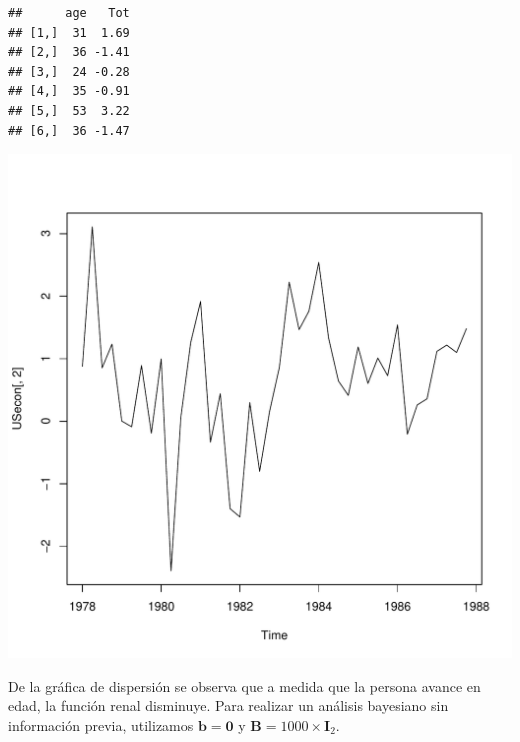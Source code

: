 \begin{Eje}
\begin{knitrout}
\begin{kframe}
{\ttfamily\noindent\itshape\color{messagecolor}{\#\# The following object is masked \_by\_ .GlobalEnv:\\\#\# \\\#\#\ \ \ \  kidneydata}}\begin{alltt}
\end{alltt}
\begin{verbatim}
##      age   Tot
## [1,]  31  1.69
## [2,]  36 -1.41
## [3,]  24 -0.28
## [4,]  35 -0.91
## [5,]  53  3.22
## [6,]  36 -1.47
\end{verbatim}
\begin{alltt}
\hlstd{(kidneydata[,}\hlstd{], kidneydata[,}\hlstd{],}\hlstd{=}\hlstd{,} \hlstd{=}\hlstd{)}
\end{alltt}
\end{kframe}
\includegraphics[width=\maxwidth]{figure/unnamed-chunk-2-1} 

\end{knitrout}
De la gráfica de dispersión se observa que a medida que la persona avance en edad, la función renal disminuye. Para realizar un análisis bayesiano sin información previa, utilizamos $\mathbf{b}=\mathbf{0}$ y $\mathbf{B}=1000\times\mathbf{I}_2$.


\end{Eje}
